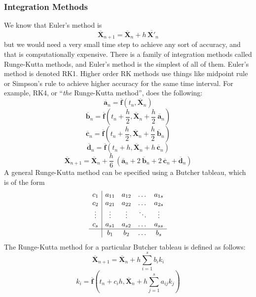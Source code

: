 \documentclass[12pt]{article}
\newcommand{\bfvec}[1]{\overline{\mathbf{#1}}}
\begin{document}
	\subsubsection*{Integration Methods}
	
	We know that Euler's method is
			$$\bfvec{X}_{n+1} = \bfvec{X}_n + h\,\bfvec{X'}_n$$
	but we would need a very small time step to achieve any sort of accuracy, and that is computationally expensive. There is a family of integration methods called Runge-Kutta methods, and Euler's method is the simplest of all of them. Euler's method is denoted RK1. Higher order RK methods use things like midpoint rule or Simpson's rule to achieve higher accuracy for the same time interval. For example, RK4, or ``\textit{the} Runge-Kutta method'', does the following:
			$$\bfvec{a}_n = \bfvec{f}(t_n, \bfvec{X}_n)$$
			$$\bfvec{b}_n = \bfvec{f}(t_n + \frac{h}{2},\bfvec{X}_n + \frac{h}{2}\ \bfvec{a}_n)$$
			$$\bfvec{c}_n = \bfvec{f}(t_n + \frac{h}{2},\bfvec{X}_n + \frac{h}{2}\ \bfvec{b}_n)$$
			$$\bfvec{d}_n = \bfvec{f}(t_n + h, \bfvec{X}_n + h\ \bfvec{c}_n)$$
			$$\bfvec{X}_{n+1} = \bfvec{X}_n + \frac{h}{6}\ (\bfvec{a}_n + 2\ \bfvec{b}_n + 2\ \bfvec{c}_n + \bfvec{d}_n)$$			
	A general Runge-Kutta method can be specified using a Butcher tableau, which is of the form	
			\[\begin{array}{c|cccc}
				c_1    & a_{11} & a_{12}& \dots & a_{1s}\\
				c_2    & a_{21} & a_{22}& \dots & a_{2s}\\
				\vdots & \vdots & \vdots& \ddots& \vdots\\
				c_s    & a_{s1} & a_{s2}& \dots & a_{ss} \\
				\hline
       			& b_1    & b_2   & \dots & b_s\\
			\end{array}\]
	The Runge-Kutta method for a particular Butcher tableau is defined as follows:
			$$\bfvec{X}_{n+1} = \bfvec{X}_n + h \sum_{i=1}^s b_i k_i$$
			$$k_i = \bfvec{f}\left(t_n + c_i h, \bfvec{X}_n + h \sum_{j = 1}^{s} a_{ij} k_j\right)$$
\end{document}

